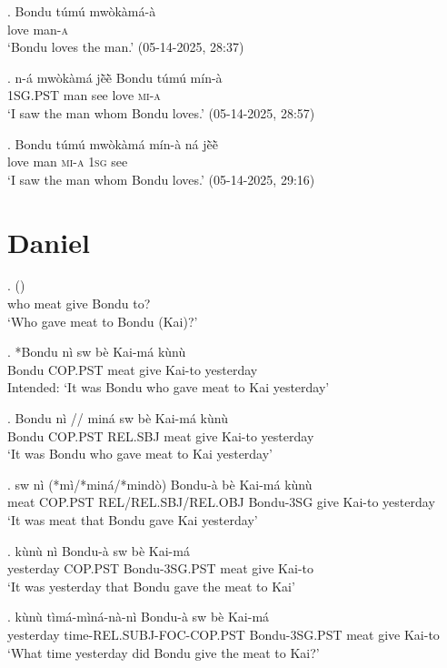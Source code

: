 \documentclass{assets/fieldnotes}
\begin{document}
\exg. Bondu túmú mwòkàmá-à\\
{} love man-\textsc{a}\\
`Bondu loves the man.’ \hfill{(05-14-2025, 28:37)}

\exg. n-á mwòkàmá jẽ̀ẽ̀ Bondu túmú mín-à\\
\textsc{1SG.PST} man see {} love \textsc{mi}-\textsc{a}\\
`I saw the man whom Bondu loves.’ \hfill{(05-14-2025, 28:57)}

\exg. Bondu túmú mwòkàmá mín-à ná jẽ̀ẽ̀\\ 
{} love man \textsc{mi}-\textsc{a} \textsc{1sg} see\\
`I saw the man whom Bondu loves.’ \hfill{(05-14-2025, 29:16)}

\section{Daniel}
\exg.     () \\
who meat give Bondu {} to?\\
`Who gave meat to Bondu (Kai)?'

\exg. *Bondu nì sw bè Kai-má kùnù\\
Bondu COP.PST meat give Kai-to yesterday\\
Intended: `It was Bondu who gave meat to Kai yesterday'

\exg. Bondu nì // miná sw bè Kai-má kùnù\\
Bondu COP.PST {} REL.SBJ meat give Kai-to yesterday\\
`It was Bondu who gave meat to Kai yesterday'

\exg. sw nì (*mì/*miná/*mindò) Bondu-à bè Kai-má kùnù\\
meat COP.PST REL/REL.SBJ/REL.OBJ Bondu-3SG give Kai-to yesterday\\
`It was meat that Bondu gave Kai yesterday'

\exg. kùnù nì Bondu-à sw bè Kai-má\\
yesterday COP.PST Bondu-3SG.PST meat give Kai-to\\
`It was yesterday that Bondu gave the meat to Kai'

\exg. kùnù tìmá-mìná-nà-nì Bondu-à sw bè Kai-má\\
yesterday time-REL.SUBJ-FOC-COP.PST Bondu-3SG.PST meat give Kai-to\\
`What time yesterday did Bondu give the meat to Kai?'
\end{document}
